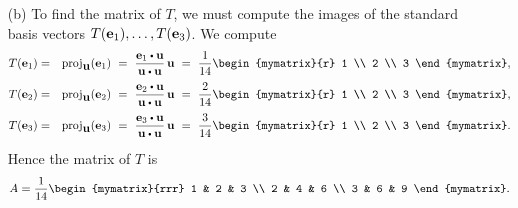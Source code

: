 \begin{solution}
\begin{enumerate}
  \item[(b)] To find the matrix of $T$, we must compute the images of
    the standard basis vectors $T(\mbox{\bf e}_1),\ldots,T(\mbox{\bf e}_3)$. We compute
    \begin{eqnarray*}
      T(\vect{e}_1)
      &=& \proj_{\vect{u}}(\vect{e}_1)
      ~=~ \frac{\vect{e}_1\dotprod \vect{u}}{\vect{u}\dotprod \vect{u}}\,\vect{u}
      ~=~ \frac{1}{14}\begin{mymatrix}{r} 1 \\ 2 \\ 3 \end{mymatrix},\\
      T(\vect{e}_2)
      &=& \proj_{\vect{u}}(\vect{e}_2)
      ~=~ \frac{\vect{e}_2\dotprod \vect{u}}{\vect{u}\dotprod \vect{u}}\,\vect{u}
      ~=~ \frac{2}{14}\begin{mymatrix}{r} 1 \\ 2 \\ 3 \end{mymatrix},\\
      T(\vect{e}_3)
      &=& \proj_{\vect{u}}(\vect{e}_3)
      ~=~ \frac{\vect{e}_3\dotprod \vect{u}}{\vect{u}\dotprod \vect{u}}\,\vect{u}
      ~=~ \frac{3}{14}\begin{mymatrix}{r} 1 \\ 2 \\ 3 \end{mymatrix}.
    \end{eqnarray*}
    Hence the matrix of $T$ is
    \begin{equation*}
      A = \frac{1}{14}\begin{mymatrix}{rrr}
        1 & 2 & 3 \\
        2 & 4 & 6 \\
        3 & 6 & 9
      \end{mymatrix}.
    \end{equation*}
  \end{enumerate}
\end{solution}

